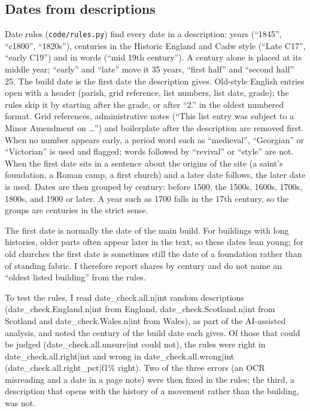 \documentclass[11pt,a4paper]{article}
\begin{document}
\subsection{Dates from descriptions}

Date rules (\texttt{code/rules.py}) find every date in a description: years (``1845'', ``c1800'', ``1820s''), centuries in the Historic England and Cadw style (``Late C17'', ``early C19'') and in words (``mid 19th century''). A century alone is placed at its middle year; ``early'' and ``late'' move it 35 years, ``first half'' and ``second half'' 25. The build date is the first date the description gives. Old-style English entries open with a header (parish, grid reference, list numbers, list date, grade); the rules skip it by starting after the grade, or after ``2.'' in the oldest numbered format. Grid references, administrative notes (``This list entry was subject to a Minor Amendment on \ldots'') and boilerplate after the description are removed first. When no number appears early, a period word such as ``medieval'', ``Georgian'' or ``Victorian'' is used and flagged; words followed by ``revival'' or ``style'' are not. When the first date sits in a sentence about the origins of the site (a saint's foundation, a Roman camp, a first church) and a later date follows, the later date is used. Dates are then grouped by century: before 1500, the 1500s, 1600s, 1700s, 1800s, and 1900 or later. A year such as 1700 falls in the 17th century, so the groups are centuries in the strict sense.

The first date is normally the date of the main build. For buildings with long histories, older parts often appear later in the text, so these dates lean young; for old churches the first date is sometimes still the date of a foundation rather than of standing fabric. I therefore report shares by century and do not name an ``oldest listed building'' from the rules.

To test the rules, I read {{date_check.all.n|int}} random descriptions ({{date_check.England.n|int}} from England, {{date_check.Scotland.n|int}} from Scotland and {{date_check.Wales.n|int}} from Wales), as part of the AI-assisted analysis, and noted the century of the build date each gives. Of those that could be judged ({{date_check.all.unsure|int}} could not), the rules were right in {{date_check.all.right|int}} and wrong in {{date_check.all.wrong|int}} ({{date_check.all.right_pct|f1}}\% right). Two of the three errors (an OCR misreading and a date in a page note) were then fixed in the rules; the third, a description that opens with the history of a movement rather than the building, was not.
\end{document}
